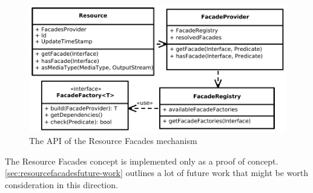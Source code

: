\documentclass[11pt,a4paper,headsepline,twoside]{scrartcl}		%
\begin{document}
\begin{figure}[htb]
  \centering
  \includegraphics[width=1\textwidth]{resourcefacades}

  \caption{The API of the Resource Facades mechanism}
  \label{fig:resourcefacades}
\end{figure}

The Resource Facades concept is implemented only as a proof of
concept. \autoref{sec:resourcefacadesfuture-work} outlines a lot of future work
that might be worth consideration in this direction.



\end{document}
